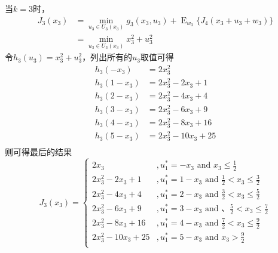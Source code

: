 \documentclass{article}
\begin{document}
\begin{enumerate}[(c)]
        当$k=3$时，
        \begin{equation}
            \begin{split}
                J_3(x_3)&=\min_{u_3\in U_3(x_3)}g_3(x_3,u_3)+\mathop{E}_{w_3}\big\{J_4(x_3+u_3+w_3)\big\}\\
                &=\min_{u_3\in U_3(x_3)}x_3^2+u_3^2
            \end{split}
        \end{equation}
        令$h_3(u_3)=x_3^2+u_3^2$，列出所有的$u_3$取值可得
        \begin{equation}
            \begin{aligned}
                h_3(-x_3)&=2x_3^2\\
                h_3(1-x_3)&=2x_3^2-2x_3+1\\
                h_3(2-x_3)&=2x_3^2-4x_3+4\\
                h_3(3-x_3)&=2x_3^2-6x_3+9\\
                h_3(4-x_3)&=2x_3^2-8x_3+16\\
                h_3(5-x_3)&=2x_3^2-10x_3+25\\
            \end{aligned}
        \end{equation}
        则可得最后的结果
        \begin{equation}
            J_3(x_3)=
            \begin{cases}
                2x_3 &, u_1^*=-x_3\text{ and } x_3\leq\frac{1}{2}\\
                2x_3^2-2x_3+1 &,u_1^*=1-x_3\text{ and } \frac{1}{2}<x_3\leq\frac{3}{2}\\
                2x_3^2-4x_3+4 &,u_1^*=2-x_3\text{ and } \frac{3}{2}<x_3\leq\frac{5}{2}\\
                2x_3^2-6x_3+9 &,u_1^*=3-x_3\text{ and } 、\frac{5}{2}<x_3\leq\frac{7}{2}\\
                2x_3^2-8x_3+16 &,u_1^*=4-x_3\text{ and } \frac{7}{2}<x_3\leq\frac{9}{2}\\
                2x_3^2-10x_3+25 &,u_1^*=5-x_3\text{ and } x_3>\frac{9}{2}\\
            \end{cases}
        \end{equation}


\end{enumerate}
\end{document}
